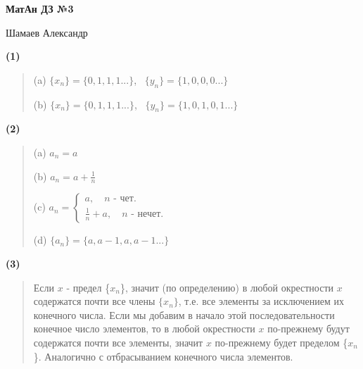 \documentclass{article}
\begin{document}
\setlength{\parindent}{0pt}
\begin{Large}
    \textsf{\textbf{МатАн ДЗ №3}}
    
    Шамаев Александр    
\end{Large}
\vspace{1cm}


\textsf{\textbf{(1)}}

\begin{quote}
(a) $\{x_n\} = \{0 , 1 , 1 , 1 ...\}$, \  $\{y_n\} = \{1 , 0 , 0 , 0 ...\}$

(b) $\{x_n\} = \{0 , 1 , 1 , 1 ...\}$, \  $\{y_n\} = \{1 , 0 , 1 , 0 , 1 ...\}$
\end{quote}

\textsf{\textbf{(2)}}

\begin{quote}
(a) $a_n = a$

(b) $a_n  = a + \frac{1}{n}$


(c) $a_n = \begin{cases}
a , \quad n\text{ - чет.} \\
\frac{1}{n} + a , \quad n\text{ - нечет.}
\end{cases}$

(d) $\{a_n\} = \{a, a - 1, a, a - 1...\}$
\end{quote}

\textsf{\textbf{(3)}}

\begin{quote}
Если $x$ - предел \{$x_n$\}, значит (по определению) в любой окрестности $x$ содержатся почти все члены $\{x_n\}$, т.е. все элементы за исключением
их конечного числа. Если мы добавим в начало этой последовательности конечное число элементов, то в любой окрестности $x$ по-прежнему будут содержатся почти все элементы, значит $x$ по-прежнему будет пределом \{$x_n$\}. Аналогично с отбрасыванием конечного числа элементов.  
\end{quote}
\end{document}
